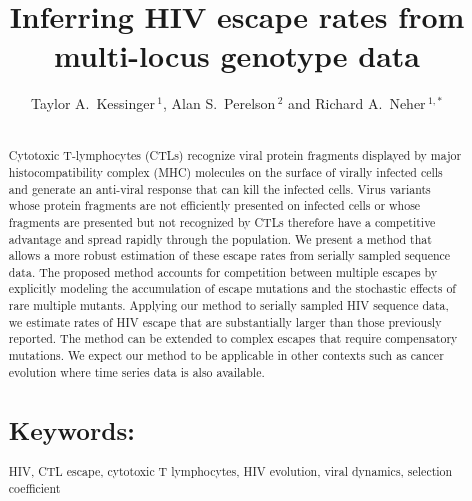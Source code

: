 \documentclass{frontiers}
\def\firstAuthorLast{Kessinger {et~al}} %
\def\Authors{Taylor A.~Kessinger\,$^{1}$, Alan S.~Perelson\,$^{2}$ and
  Richard A.~Neher\,$^{1,*}$}
\begin{document}
\onecolumn
{}

\title[Inferring HIV escape rates]{Inferring HIV escape rates from multi-locus genotype data}
\author[\firstAuthorLast ]{\Authors}
\address{}
\correspondance{}
\editor{}

\maketitle

\begin{abstract}
\section{}
Cytotoxic T-lymphocytes (CTLs) recognize viral protein fragments displayed by major histocompatibility complex (MHC) molecules on the surface of virally infected cells and generate an anti-viral response that can kill the infected cells. Virus variants whose protein fragments are not efficiently presented on infected cells or whose fragments are presented but not recognized by CTLs therefore have a competitive advantage and spread rapidly through the population. We present a method that allows a more robust estimation of these escape rates from serially sampled sequence data. The proposed method accounts for competition between multiple escapes by explicitly modeling the accumulation of escape mutations and the stochastic effects of rare multiple mutants. Applying our method to serially sampled HIV sequence data, we estimate rates of HIV escape that are substantially larger than those previously reported. The method can be extended to complex escapes that require compensatory mutations. We expect our method to be applicable in other contexts such as cancer evolution where time series data is also available.
\tiny
\section{Keywords:} HIV,  CTL escape, cytotoxic T lymphocytes, HIV evolution, viral dynamics, selection coefficient
\end{abstract}

\maketitle
\end{document}
